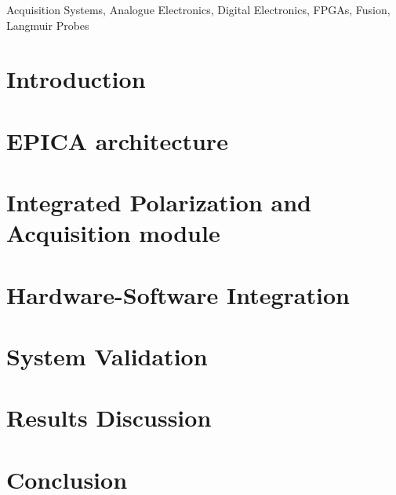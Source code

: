 \documentclass{IEEEtran}
\begin{document}
	\begin{IEEEkeywords}
		Acquisition Systems, Analogue Electronics, Digital Electronics, FPGAs, Fusion, Langmuir Probes
	\end{IEEEkeywords}
	
	\section{Introduction} \label{secI}
	
	
	\section{EPICA architecture} \label{secII}
	
	
	\section{Integrated Polarization and Acquisition module} \label{secIII}
	
	
	\section{Hardware-Software Integration} \label{secIV}
	
	
	\section{System Validation} \label{secV}
	
	
	\section{Results Discussion} \label{secVI}
	
	
	\section{Conclusion} \label{secVII}
	
	
	
	
\end{document}
